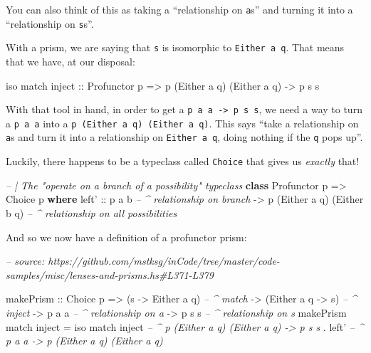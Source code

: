 \documentclass[]{article}
\newenvironment{Shaded}{}{}
\newcommand{\CommentTok}[1]{\textcolor[rgb]{0.38,0.63,0.69}{\textit{#1}}}
\newcommand{\DataTypeTok}[1]{\textcolor[rgb]{0.56,0.13,0.00}{#1}}
\newcommand{\FunctionTok}[1]{\textcolor[rgb]{0.02,0.16,0.49}{#1}}
\newcommand{\KeywordTok}[1]{\textcolor[rgb]{0.00,0.44,0.13}{\textbf{#1}}}
\newcommand{\NormalTok}[1]{#1}
\newcommand{\OtherTok}[1]{\textcolor[rgb]{0.00,0.44,0.13}{#1}}
\begin{document}
You can also think of this as taking a ``relationship on \texttt{a}s'' and
turning it into a ``relationship on \texttt{s}s''.

With a prism, we are saying that \texttt{s} is isomorphic to
\texttt{Either\ a\ q}. That means that we have, at our disposal:

\begin{Shaded}
\begin{Highlighting}[]
\NormalTok{iso match inject}
\OtherTok{    ::} \DataTypeTok{Profunctor}\NormalTok{ p}
    \OtherTok{=>}\NormalTok{ p (}\DataTypeTok{Either}\NormalTok{ a q) (}\DataTypeTok{Either}\NormalTok{ a q)}
    \OtherTok{->}\NormalTok{ p s s}
\end{Highlighting}
\end{Shaded}

With that tool in hand, in order to get a
\texttt{p\ a\ a\ -\textgreater{}\ p\ s\ s}, we need a way to turn a
\texttt{p\ a\ a} into a \texttt{p\ (Either\ a\ q)\ (Either\ a\ q)}. This says
``take a relationship on \texttt{a}s and turn it into a relationship on
\texttt{Either\ a\ q}, doing nothing if the \texttt{q} pops up''.

Luckily, there happens to be a typeclass called \texttt{Choice} that gives us
\emph{exactly} that!

\begin{Shaded}
\begin{Highlighting}[]
\CommentTok{-- | The "operate on a branch of a possibility" typeclass}
\KeywordTok{class} \DataTypeTok{Profunctor}\NormalTok{ p }\OtherTok{=>} \DataTypeTok{Choice}\NormalTok{ p }\KeywordTok{where}
\NormalTok{    left'}
\OtherTok{        ::}\NormalTok{ p a b                        }\CommentTok{-- ^ relationship on branch}
        \OtherTok{->}\NormalTok{ p (}\DataTypeTok{Either}\NormalTok{ a q) (}\DataTypeTok{Either}\NormalTok{ b q)  }\CommentTok{-- ^ relationship on all possibilities}
\end{Highlighting}
\end{Shaded}

And so we now have a definition of a profunctor prism:

\begin{Shaded}
\begin{Highlighting}[]
\CommentTok{-- source: https://github.com/mstksg/inCode/tree/master/code-samples/misc/lenses-and-prisms.hs#L371-L379}

\NormalTok{makePrism}
\OtherTok{    ::} \DataTypeTok{Choice}\NormalTok{ p}
    \OtherTok{=>}\NormalTok{ (s }\OtherTok{->} \DataTypeTok{Either}\NormalTok{ a q)    }\CommentTok{-- ^ match}
    \OtherTok{->}\NormalTok{ (}\DataTypeTok{Either}\NormalTok{ a q }\OtherTok{->}\NormalTok{ s)    }\CommentTok{-- ^ inject}
    \OtherTok{->}\NormalTok{ p a a                }\CommentTok{-- ^ relationship on a}
    \OtherTok{->}\NormalTok{ p s s                }\CommentTok{-- ^ relationship on s}
\NormalTok{makePrism match inject }\FunctionTok{=}
\NormalTok{    iso match inject   }\CommentTok{-- ^ p (Either a q) (Either a q) -> p s s}
  \FunctionTok{.}\NormalTok{ left'              }\CommentTok{-- ^ p a a -> p (Either a q) (Either a q)}
\end{Highlighting}
\end{Shaded}
\end{document}
